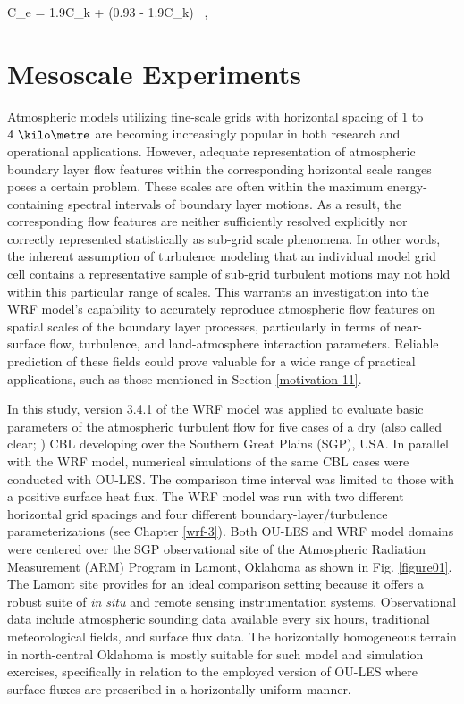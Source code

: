 \be
C_e = 1.9C_k + \left(0.93 - 1.9C_k\right) \mbox{ ,} 
\label{equation381}
\ee


\chapter{Mesoscale Experiments}
\label{mesoscale-4}

Atmospheric models utilizing fine-scale grids with horizontal spacing of $1$ to $4 \mbox{ }\kilo\metre$ are becoming increasingly popular in both research and operational applications. However, adequate representation of atmospheric boundary layer flow features within the corresponding horizontal scale ranges poses a certain problem. These scales are often within the maximum energy-containing spectral intervals of boundary layer motions. As a result, the corresponding flow features are neither sufficiently resolved explicitly nor correctly represented statistically as sub-grid scale phenomena. In other words, the inherent assumption of turbulence modeling that an individual model grid cell contains a representative sample of sub-grid turbulent motions may not hold within this particular range of scales. This warrants an investigation into the WRF model's capability to accurately reproduce atmospheric flow features on spatial scales of the boundary layer processes, particularly in terms of near-surface flow, turbulence, and land-atmosphere interaction parameters. Reliable prediction of these fields could prove valuable for a wide range of practical applications, such as those mentioned in Section \autoref{motivation-11}.

In this study, version 3.4.1 of the WRF model was applied to evaluate basic parameters of the atmospheric turbulent flow for five cases of a dry (also called clear; \citealt{Holtslag1998}) CBL developing over the Southern Great Plains (SGP), USA. In parallel with the WRF model, numerical simulations of the same CBL cases were conducted with OU-LES. The comparison time interval was limited to those with a positive surface heat flux. The WRF model was run with two different horizontal grid spacings and four different boundary-layer\slash turbulence parameterizations (see Chapter \autoref{wrf-3}). Both OU-LES and WRF model domains were centered over the SGP observational site of the Atmospheric Radiation Measurement (ARM) Program in Lamont, Oklahoma as shown in Fig. \autoref{figure01}. The Lamont site provides for an ideal comparison setting because it offers a robust suite of \textit{in situ} and remote sensing instrumentation systems. Observational data include atmospheric sounding data available every six hours, traditional meteorological fields, and surface flux data. The horizontally homogeneous terrain in north-central Oklahoma is mostly suitable for such model and simulation exercises, specifically in relation to the employed version of OU-LES where surface fluxes are prescribed in a horizontally uniform manner.


